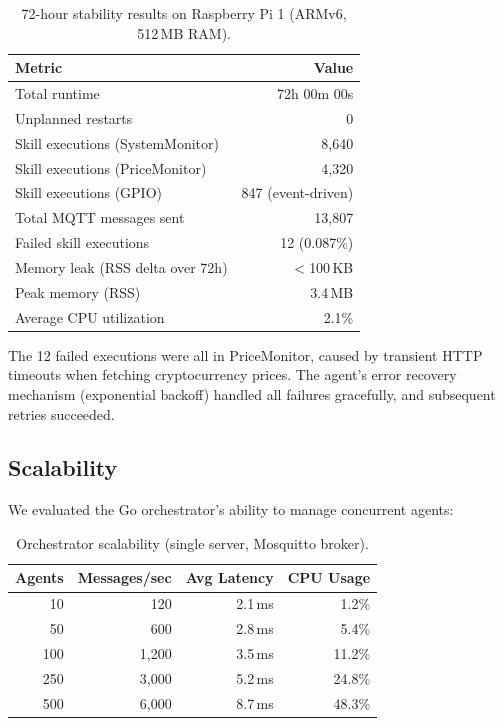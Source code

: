 \documentclass{article}
\begin{document}
\begin{table}[t]
\centering
\caption{72-hour stability results on Raspberry Pi 1 (ARMv6, 512\,MB RAM).}
\label{tab:stability}
\small
\begin{tabular}{lr}
\toprule
\textbf{Metric} & \textbf{Value} \\
\midrule
Total runtime & 72h 00m 00s \\
Unplanned restarts & 0 \\
Skill executions (SystemMonitor) & 8,640 \\
Skill executions (PriceMonitor) & 4,320 \\
Skill executions (GPIO) & 847 (event-driven) \\
Total MQTT messages sent & 13,807 \\
Failed skill executions & 12 (0.087\%) \\
Memory leak (RSS delta over 72h) & $<$100\,KB \\
Peak memory (RSS) & 3.4\,MB \\
Average CPU utilization & 2.1\% \\
\bottomrule
\end{tabular}
\end{table}

The 12 failed executions were all in PriceMonitor, caused by transient HTTP timeouts when fetching cryptocurrency prices. The agent's error recovery mechanism (exponential backoff) handled all failures gracefully, and subsequent retries succeeded.


\subsection{Scalability}

We evaluated the Go orchestrator's ability to manage concurrent agents:

\begin{table}[t]
\centering
\caption{Orchestrator scalability (single server, Mosquitto broker).}
\label{tab:scalability}
\small
\begin{tabular}{rrrr}
\toprule
\textbf{Agents} & \textbf{Messages/sec} & \textbf{Avg Latency} & \textbf{CPU Usage} \\
\midrule
10 & 120 & 2.1\,ms & 1.2\% \\
50 & 600 & 2.8\,ms & 5.4\% \\
100 & 1,200 & 3.5\,ms & 11.2\% \\
250 & 3,000 & 5.2\,ms & 24.8\% \\
500 & 6,000 & 8.7\,ms & 48.3\% \\
\bottomrule
\end{tabular}
\end{table}
\end{document}
